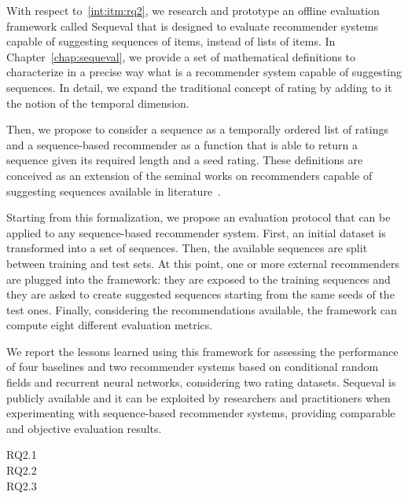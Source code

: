 With respect to~\ref{int:itm:rq2}, we research and prototype an offline evaluation framework called Sequeval that is designed to evaluate recommender systems capable of suggesting sequences of items, instead of lists of items. In Chapter~\ref{chap:sequeval}, we provide a set of mathematical definitions to characterize in a precise way what is a recommender system capable of suggesting sequences. In detail, we expand the traditional concept of rating by adding to it the notion of the temporal dimension.

Then, we propose to consider a sequence as a temporally ordered list of ratings and a sequence-based recommender as a function that is able to return a sequence given its required length and a seed rating. These definitions are conceived as an extension of the seminal works on recommenders capable of suggesting sequences available in literature~\cite{Quadrana2018}.

Starting from this formalization, we propose an evaluation protocol that can be applied to any sequence-based recommender system. First, an initial dataset is transformed into a set of sequences. Then, the available sequences are split between training and test sets. At this point, one or more external recommenders are plugged into the framework: they are exposed to the training sequences and they are asked to create suggested sequences starting from the same seeds of the test ones. Finally, considering the recommendations available, the framework can compute eight different evaluation metrics.

We report the lessons learned using this framework for assessing the performance of four baselines and two recommender systems based on conditional random fields and recurrent neural networks, considering two rating datasets. Sequeval is publicly available and it can be exploited by researchers and practitioners when experimenting with sequence-based recommender systems, providing comparable and objective evaluation results. 

\begin{description}
\item[RQ2.1] 
\item[RQ2.2] 
\item[RQ2.3] 
\end{description}

